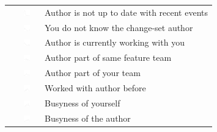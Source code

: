 \begin{table}[t!]
\begin{tabular}{rll}
&\vspace{-2pt}\includegraphics[height=10px, width=30px]{figures/sparkles/change-author-is-not-up-to-date-with-recent-events.pdf} & Author is not up to date with recent events\\
&\vspace{-2pt}\includegraphics[height=10px, width=30px]{figures/sparkles/don-t-know-the-change-author.pdf} & You do not know the change-set author \\
&\vspace{-2pt}\includegraphics[height=10px, width=30px]{figures/sparkles/currently-working-with-the-change-author.pdf} & Author is currently working with you\\
&\vspace{-2pt}\includegraphics[height=10px, width=30px]{figures/sparkles/change-author-part-of-the-same-feature-team.pdf} & Author part of same feature team\\
&\vspace{-2pt}\includegraphics[height=10px, width=30px]{figures/sparkles/team-of-change-author.pdf} & Author part of your team\\
&\vspace{-2pt}\includegraphics[height=10px, width=30px]{figures/sparkles/worked-with-change-author-in-the-past.pdf} & Worked with author before\\
&\vspace{-2pt}\includegraphics[height=10px, width=30px]{figures/sparkles/busyness-of-yourself} & Busyness of yourself\\
&\vspace{-2pt}\includegraphics[height=10px, width=30px]{figures/sparkles/busyness-of-the-change-author} & Busyness of the author\\

\end{tabular}
\end{table}
